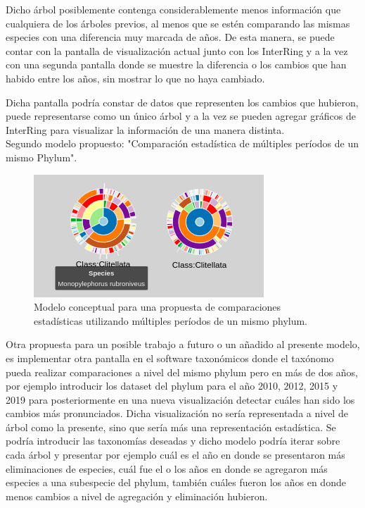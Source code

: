 \documentclass[journal]{IEEEtran}
\begin{document}
Dicho árbol posiblemente contenga considerablemente menos información que cualquiera de los árboles previos, al menos que se estén comparando las mismas especies con una diferencia muy marcada de años. De esta manera, se puede contar con la pantalla de visualización actual junto con los InterRing y a la vez con una segunda pantalla donde se muestre la diferencia o los cambios que han habido entre los años, sin mostrar lo que no haya cambiado.

Dicha pantalla podría constar de datos que representen los cambios que hubieron, puede representarse como un único árbol y a la vez se pueden agregar gráficos de InterRing para visualizar la información de una manera distinta. \\

Segundo modelo propuesto: "Comparación estadística de múltiples períodos de un mismo Phylum".
\begin{figure}
  \centering
  \includegraphics[]{interringCompare.png}
  \caption{Modelo conceptual para una propuesta de comparaciones estadísticas utilizando múltiples períodos de un mismo phylum.}
  \label{mockup}
\end{figure}
Otra propuesta para un posible trabajo a futuro o un añadido al presente modelo, es implementar otra pantalla en el software taxonómicos donde el taxónomo pueda realizar comparaciones a nivel del mismo phylum pero en más de dos años, por ejemplo introducir los dataset del phylum para el año 2010, 2012, 2015 y 2019 para posteriormente en una nueva visualización detectar cuáles han sido los cambios más pronunciados. Dicha visualización no sería representada a nivel de árbol como la presente, sino que sería más una representación estadística. Se podría introducir las taxonomías deseadas y dicho modelo podría iterar sobre cada árbol y presentar por ejemplo cuál es el año en donde se presentaron más eliminaciones de especies, cuál fue el o los años en donde se agregaron más especies a una subespecie del phylum, también cuáles fueron los años en donde menos cambios a nivel de agregación y eliminación hubieron. 
\end{document}
